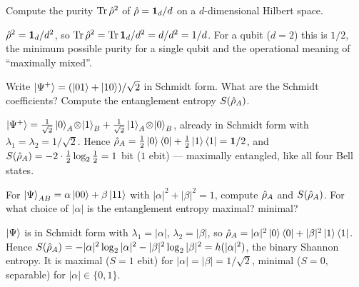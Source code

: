 \begin{exercise}
Compute the purity $\operatorname{Tr}\hat{\rho}^2$ of $\hat{\rho}=\mathbf{1}_d/d$ on a
$d$-dimensional Hilbert space.
\begin{solution}
$\hat{\rho}^2=\mathbf{1}_d/d^2$, so
$\operatorname{Tr}\hat{\rho}^2=\operatorname{Tr}\mathbf{1}_d/d^2=d/d^2=1/d$. For a qubit
($d=2$) this is $1/2$, the minimum possible purity for a single
qubit and the operational meaning of ``maximally mixed''.
\end{solution}
\end{exercise}

\begin{exercise}
Write $\ket{\Psi^+}=(\ket{01}+\ket{10})/\sqrt 2$ in Schmidt form.
What are the Schmidt coefficients? Compute the entanglement
entropy $S(\hat{\rho}_A)$.
\begin{solution}
$\ket{\Psi^+}=\tfrac{1}{\sqrt 2}\ket{0}_A\!\otimes\!\ket{1}_B
+\tfrac{1}{\sqrt 2}\ket{1}_A\!\otimes\!\ket{0}_B$, already in
Schmidt form with $\lambda_1=\lambda_2=1/\sqrt 2$. Hence
$\hat{\rho}_A=\tfrac12\ket{0}\bra{0}+\tfrac12\ket{1}\bra{1}=\mathbf{1}/2$,
and $S(\hat{\rho}_A)=-2\cdot\tfrac12\log_2\tfrac12=1$ bit ($1$
ebit) --- maximally entangled, like all four Bell states.
\end{solution}
\end{exercise}

\begin{exercise}
For
$\ket{\Psi}_{AB}=\alpha\ket{00}+\beta\ket{11}$ with
$|\alpha|^2+|\beta|^2=1$, compute $\hat{\rho}_A$ and
$S(\hat{\rho}_A)$. For what choice of $|\alpha|$ is the entanglement
entropy maximal? minimal?
\begin{solution}
$\ket\Psi$ is in Schmidt form with $\lambda_1=|\alpha|$,
$\lambda_2=|\beta|$, so
$\hat{\rho}_A=|\alpha|^2\ket{0}\bra{0}+|\beta|^2\ket{1}\bra{1}$.
Hence $S(\hat{\rho}_A)=-|\alpha|^2\log_2|\alpha|^2-|\beta|^2\log_2|\beta|^2
=h(|\alpha|^2)$, the binary Shannon entropy. It is maximal
($S=1$ ebit) for $|\alpha|=|\beta|=1/\sqrt 2$, minimal ($S=0$,
separable) for $|\alpha|\in\{0,1\}$.
\end{solution}
\end{exercise}


